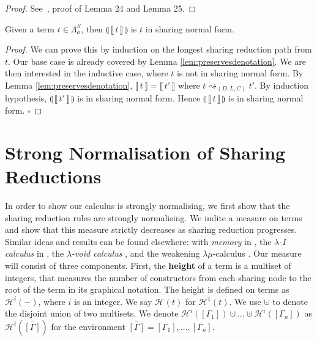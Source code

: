 \documentclass[runningheads]{llncs}
\newcommand\defn{\textbf}
\newcommand{\FALC}{\Lambda^{S}_{a}}
\newcommand{\compile}[1]{\llparenthesis \, #1 \, \rrparenthesis}
\newcommand{\readbackclose}[1]{\llbracket \, #1 \, \rrbracket }
\newcommand{\height}[2]{\mathcal{H}^{#1}(#2)}
\newcommand*{\QEDB}{\hfill\ensuremath{\square}}
\begin{document}
\begin{proof}
See~\cite{sherratt2019atomic}, proof of Lemma 24 and Lemma 25.
\end{proof}

\begin{lemma}
\label{lem:deliasnf}
Given a term $t \in \FALC$, then $\compile{\readbackclose{t}}$ is $t$ in sharing normal form. 
\end{lemma}
\begin{proof}
We can prove this by induction on the longest sharing reduction path from $t$. Our base case is already covered by Lemma \ref{lem:preservesdenotation}. We are then interested in the inductive case, where $t$ is not in sharing normal form. By Lemma \ref{lem:preservesdenotation}, $\readbackclose{t} = \readbackclose{t'}$ where $t \rightsquigarrow_{(D, L, C)} t'$. By induction hypothesis, $\compile{\readbackclose{t'}}$ is in sharing normal form. Hence $\compile{\readbackclose{t}}$ is in sharing normal form.  \QEDB
\end{proof}

\section{Strong Normalisation of Sharing Reductions}
\label{chap:snosr}

In order to show our calculus is strongly normalising, we first show that the sharing reduction rules are strongly normalising. We indite a measure on terms and show that this measure strictly decreases as sharing reduction progresses. Similar ideas and results can be found elsewhere: with \emph{memory} in \cite{Klop-1980}, the \emph{$\lambda$-$I$ calculus} in \cite{Barendregt-1984}, the \emph{$\lambda$-void calculus} \cite{Accattoli-Kesner-2012}, and the weakening $\lambda\mu$-calculus \cite{He-2018}. Our measure will consist of three components. First, the \defn{height} of a term is a multiset of integers, that measures the number of constructors from each sharing node to the root of the term in its graphical notation. The height is defined on terms as $\height{i}{-}$, where $i$ is an integer. We say $\height{}{t}$ for $\height{1}{t}$. We use $\cupdot$ to denote the disjoint union of two multisets. We denote $\height{i}{[\Gamma_{1}]} \cupdot \dots \cupdot \height{i}{[\Gamma_{n}]}$ as $\height{i}{\overline{[\Gamma]}}$ for the environment $\overline{[\Gamma]} = [\Gamma_{1}], \dots, [\Gamma_{n}]$.
\end{document}
